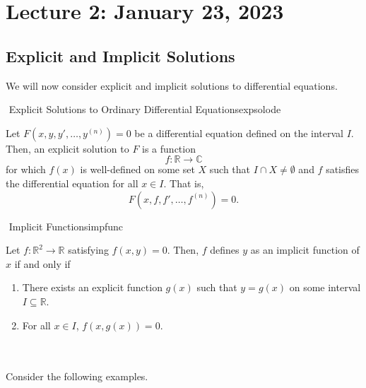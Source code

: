 \section{Lecture 2: January 23, 2023}

    \subsection{Explicit and Implicit Solutions}

        We will now consider explicit and implicit solutions to differential equations.
        \begin{definition}{\Stop\,\,Explicit Solutions to Ordinary Differential Equations}{expsolode}
            
            Let \(F(x,y,y',\ldots,y^{(n)})=0\) be a differential equation defined on the interval \(I\). Then, an explicit solution to \(F\) is a function
            \begin{equation*}
                f:\mathbb{R}\to\mathbb{C}
            \end{equation*}
            for which \(f(x)\) is well-defined on some set \(X\) such that \(I\cap X\neq\emptyset\) and \(f\) satisfies the differential equation for all \(x \in I\). That is,
            \begin{equation*}
                F(x,f,f',\ldots,f^{(n)})=0.
            \end{equation*}

        \end{definition}
        \begin{definition}{\Stop\,\,Implicit Functions}{impfunc}

            Let \(f:\mathbb{R}^2\to\mathbb{R}\) satisfying \(f(x,y)=0\). Then, \(f\) defines \(y\) as an implicit function of \(x\) if and only if
            \begin{enumerate}
                \item There exists an explicit function \(g(x)\) such that \(y=g(x)\) on some interval \(I\subseteq \mathbb{R}\).
                \item For all \(x\in I\), \(f(x,g(x))=0\).
            \end{enumerate}
            
        \end{definition}
        \vphantom
        \\
        \\
        Consider the following examples.
